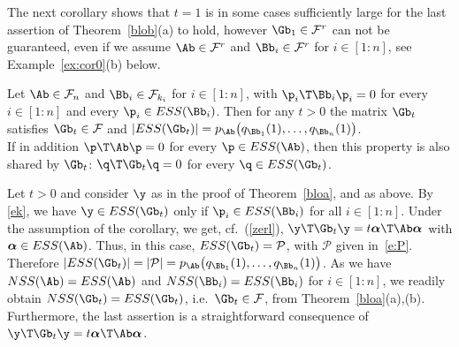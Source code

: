 \documentclass[moor]{informs3}              %
\def\reff#1{(\ref{#1})}
\def\irg#1#2{{ \in\! [{#1}\! : \! {#2}]}}
\begin{document}
The next corollary shows that $t=1$ is in some cases sufficiently large for the last assertion of Theorem~\ref{blob}(a) to hold, however $\Gb_1\in\mathcal{F}^r$ can not be guaranteed,
even if we assume $\Ab\in\mathcal{F}^r$ and $\Bb_i\in\mathcal{F}^r$ for $i\irg 1n$, see Example~\ref{ex:cor0}(b) below.
\begin{cly}\label{cor0}
Let $\Ab\in\mathcal{F}_n$ and $\Bb_i\in\mathcal{F}_{k_i}$ for $i\irg 1n$, with $\p_i\T\Bb_i\p_i=0$ for every $i\irg 1n$ and every $\p_i\in ESS(\Bb_i)$.
Then for any $t>0$ the matrix $\Gb_t$ satisfies $\Gb_t\in\mathcal{F}$ and $|ESS(\Gb_t)|=p_{\Ab}\big(q_{\Bb_1}(1),\ldots,q_{\Bb_n}(1)\big)$.\\
If in addition $\p\T\Ab\p=0$ for every $\p\in ESS(\Ab)$, then this property is also shared by $\Gb_t$: $\q\T\Gb_t\q=0$ for every $\q\in ESS(\Gb_t)$.
\end{cly}
\bep
Let $t>0$ and consider $\y$ as in the proof of Theorem~\ref{bloa}, and as above.
By \eqref{ek}, we have $\y\in ESS(\Gb_{t})$
only if $\p_i\in ESS(\Bb_i)$  for all $i\irg 1n$. Under the assumption of the corollary, we get, cf.~\reff{zerl},
$\y\T\Gb_t\y=t\bm{\alpha}\T\Ab\bm{\alpha}$ with $\bm{\alpha}\in ESS(\Ab)$. Thus, in this case, $ESS(\Gb_t)=\mathcal{P}$, with $\mathcal{P}$ given in~\eqref{e:P}.
Therefore $|ESS(\Gb_t)|=|\mathcal{P}|=p_{\Ab}\big(q_{\Bb_1}(1),\ldots,q_{\Bb_n}(1)\big)$.
As we have $NSS(\Ab)=ESS(\Ab)$ and $NSS(\Bb_i)=ESS(\Bb_i)$ for $i\irg 1n$, we readily obtain $NSS(\Gb_t)=ESS(\Gb_t)$, i.e.~$\Gb_t\in \mathcal{F}$, from Theorem~\ref{bloa}(a),(b).
Furthermore, the last assertion is a straightforward consequence of $\y\T\Gb_t\y=t\bm{\alpha}\T\Ab\bm{\alpha}$.
\ep
\end{document}
